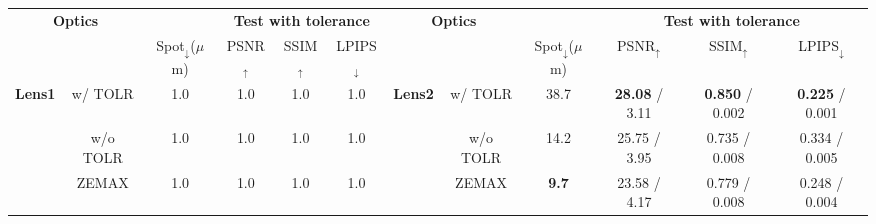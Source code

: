 \renewcommand{\arraystretch}{1.3}

\begin{tabularx}{\linewidth}{Xc|ccccXc|cccc}
    \toprule
    \multicolumn{2}{c}{\multirow{2}{*}{\textbf{Optics}}} & & \multicolumn{3}{c}{\textbf{Test with tolerance \color{Green}{(100$\times$)}}} & \multicolumn{2}{c}{\multirow{2}{*}{\textbf{Optics}}} & & \multicolumn{3}{c}{\textbf{Test with tolerance \color{Green}{(100$\times$)}}} \\
    \cmidrule{4-6} \cmidrule{10-12}
    \multicolumn{2}{c}{} & Spot$_\downarrow$($\mu$m) & PSNR$_\uparrow$ & SSIM$_\uparrow$ & LPIPS$_\downarrow$ & \multicolumn{2}{c}{} & Spot$_\downarrow$($\mu$m) & PSNR$_\uparrow$ & SSIM$_\uparrow$ & LPIPS$_\downarrow$ \\
    \midrule
    \multirow{3}{*}{\textbf{Lens1}}& w/ TOLR & 1.0 & 1.0 & 1.0 & 1.0  & \multirow{3}{*}{\textbf{Lens2}}& w/ TOLR & 38.7 & \cellcolor{red!12.5} \textbf{28.08} / 3.11 & \cellcolor{red!12.5} \textbf{0.850} / 0.002 & \cellcolor{red!12.5} \textbf{0.225} / 0.001 \\
    & w/o TOLR & 1.0 & 1.0 & 1.0 & 1.0 & & w/o TOLR & 14.2 & 25.75 / 3.95 & 0.735 / 0.008 & 0.334 / 0.005 \\
    & ZEMAX & 1.0 & 1.0 & 1.0 & 1.0 &  & ZEMAX & \cellcolor{red!12.5} \textbf{9.7} & 23.58 / 4.17 & 0.779 / 0.008 & 0.248 / 0.004 \\
    \bottomrule
\end{tabularx}